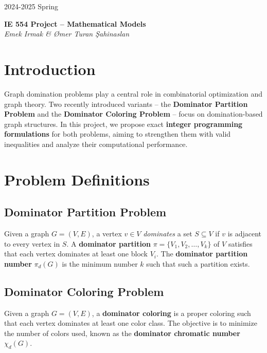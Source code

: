 \documentclass[12pt]{article}
\begin{document}
\begin{tcolorbox}[colback=white, bottomrule=1mm, sharp corners]
    2024-2025 Spring
    \begin{center}
        \Large
        \textbf{IE 554 Project -- Mathematical Models}
        \\[4mm]
        \normalsize
        \hfill \textsl{Emek Irmak \& \O mer Turan \c Sahinaslan}
    \end{center}
\end{tcolorbox}

\tableofcontents
\clearpage
{}

\section{Introduction}
Graph domination problems play a central role in combinatorial optimization and graph theory. Two recently introduced variants -- the \textbf{Dominator Partition Problem} and the \textbf{Dominator Coloring Problem} -- focus on domination-based graph structures. In this project, we propose exact \textbf{integer programming formulations} for both problems, aiming to strengthen them with valid inequalities and analyze their computational performance.

\section{Problem Definitions}

\subsection{Dominator Partition Problem}
Given a graph $G = (V, E)$, a vertex $v \in V$ \textit{dominates} a set $S \subseteq V$ if $v$ is adjacent to every vertex in $S$. A \textbf{dominator partition} $\pi = \{V_1, V_2, \dots, V_k\}$ of $V$ satisfies that each vertex dominates at least one block $V_i$. The \textbf{dominator partition number} $\pi_d(G)$ is the minimum number $k$ such that such a partition exists.

\subsection{Dominator Coloring Problem}
Given a graph $G = (V, E)$, a \textbf{dominator coloring} is a proper coloring such that each vertex dominates at least one color class. The objective is to minimize the number of colors used, known as the \textbf{dominator chromatic number} $\chi_d(G)$.
\end{document}
